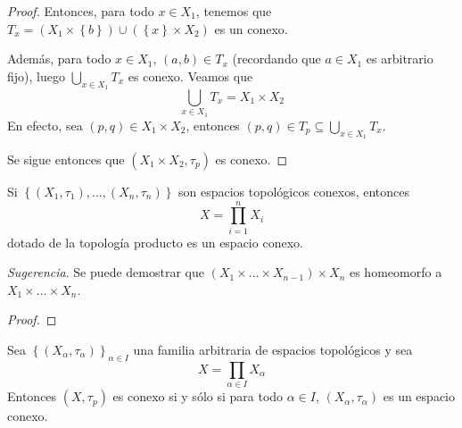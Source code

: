 \documentclass[12pt]{report}
\theoremstyle{largebreak}
\begin{document}
    \begin{proof}
        

        Entonces, para todo $x\in X_1$, tenemos que $T_x=(X_1\times\left\{b\right\})\cup(\left\{x\right\}\times X_2)$ es un conexo.

        Además, para todo $x\in X_1$, $(a,b)\in T_x$ (recordando que $a\in X_1$ es arbitrario fijo), luego $\bigcup_{ x\in X_1}T_x$ es conexo. Veamos que
        \begin{equation*}
            \bigcup_{ x\in X_1}T_x=X_1\times X_2
        \end{equation*}
        En efecto, sea $(p,q)\in X_1\times X_2$, entonces $(p,q)\in T_p\subseteq\bigcup_{x\in X_1}T_x$.
    
        Se sigue entonces que $(X_1\times X_2,\tau_p)$ es conexo.
    \end{proof}

    \begin{excer}
        Si $\left\{(X_1,\tau_1),...,(X_n,\tau_n)\right\}$ son espacios topológicos conexos, entonces
        \begin{equation*}
            X=\prod_{ i=1}^n X_i
        \end{equation*}
        dotado de la topología producto es un espacio conexo.
        
        \textit{Sugerencia}. Se puede demostrar que $(X_1\times...\times X_{ n-1})\times X_n$ es homeomorfo a $X_1\times...\times X_n$.
    \end{excer}

    \begin{proof}
    \end{proof}

    \begin{propo}
        Sea $\left\{(X_\alpha,\tau_\alpha)\right\}_{\alpha\in I}$ una familia arbitraria de espacios topológicos y sea
        \begin{equation*}
            X=\prod_{\alpha\in I}X_\alpha
        \end{equation*}
        Entonces $(X,\tau_p)$ es conexo si y sólo si para todo $\alpha\in I$, $(X_\alpha,\tau_\alpha)$ es un espacio conexo.
    \end{propo}
\end{document}
